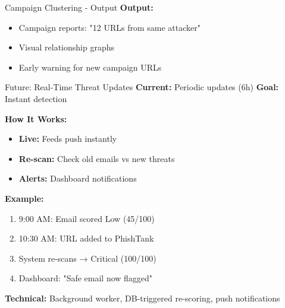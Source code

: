 \documentclass[aspectratio=169]{beamer}
\begin{document}
\begin{frame}{Campaign Clustering - Output}
\small
\textbf{Output:}
\begin{itemize}
    \item Campaign reports: "12 URLs from same attacker"
    \item Visual relationship graphs
    \item Early warning for new campaign URLs
\end{itemize}
\end{frame}

\begin{frame}{Future: Real-Time Threat Updates}
\small
\textbf{Current:} Periodic updates (6h) \quad \textbf{Goal:} Instant detection

\vspace{0.15cm}
\textbf{How It Works:}
\begin{itemize}
    \scriptsize
    \item \textbf{Live:} Feeds push instantly
    \item \textbf{Re-scan:} Check old emails vs new threats
    \item \textbf{Alerts:} Dashboard notifications
\end{itemize}

\vspace{0.15cm}
\textbf{Example:}
\begin{enumerate}
    \scriptsize
    \item 9:00 AM: Email scored Low (45/100)
    \item 10:30 AM: URL added to PhishTank
    \item System re-scans → Critical (100/100)
    \item Dashboard: "Safe email now flagged"
\end{enumerate}

\vspace{0.05cm}
\scriptsize
\textbf{Technical:} Background worker, DB-triggered re-scoring, push notifications
\end{frame}
\end{document}
